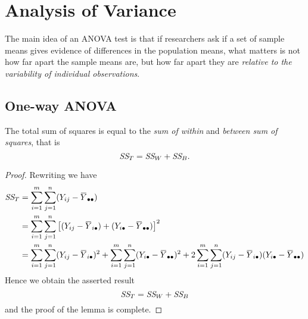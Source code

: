\chapter{Analysis of Variance}

The main idea of an ANOVA test is that if researchers ask if a set of sample means gives 
evidence of differences in the population means, what matters is not how far apart 
the sample means are, but how far apart they are \textit{relative to the variability of 
individual observations}.

\section{One-way ANOVA}

\begin{lemma}
    \label{lem:an01}
    The total sum of squares is equal to the \textit{sum of within} and \textit{between sum of squares}, that is 
    \begin{equation}
        \textit{SS}_{T} = \textit{SS}_{W} + \textit{SS}_{B}.
    \end{equation}
\end{lemma}
\begin{proof}
    Rewriting we have 
    \begin{align*}
        \CS{T} &= \sum^m_{i=1} \sum^n_{j=1} (Y_{ij} - \ols{Y}_{\bullet \bullet })\\
        &= \sum^m_{i=1} \sum^n_{j=1} \left[ (Y_{ij} - \ols{Y}_{i \bullet }) + (Y_{i\bullet} - \ols{Y}_{\bullet \bullet }) \right]^2\\
        &= \sum^m_{i=1} \sum^n_{j=1} (Y_{ij} - \ols{Y}_{i \bullet })^2 + \sum^m_{i=1} \sum^n_{j=1}(Y_{i\bullet} - \ols{Y}_{\bullet \bullet })^2
        + 2 \sum^m_{i=1} \sum^n_{j=1} (Y_{ij} - \ols{Y}_{i \bullet })(Y_{i\bullet} - \ols{Y}_{\bullet \bullet })\\
    \end{align*}
    Hence we obtain the asserted result
    \[
        \textit{SS}_{T} = \textit{SS}_{W} + \textit{SS}_{B}
    \]
    and the proof of the lemma is complete.
\end{proof}

